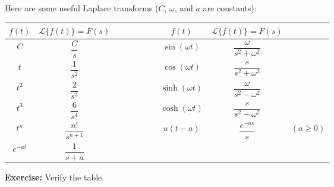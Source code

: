 \documentclass[10pt,aspectratio=169]{beamer}
\begin{document}
\begin{frame}

Here are some useful Laplace transforms ($C$, $\omega$, and $a$ are constants):

\begin{center}
\begin{tabular}{@{}ccclccc@{}}
\toprule
$f(t)$ & $\mathcal{L} \bigl\{ f(t) \bigr\} = F(s)$ &  & $\qquad\quad$ &
$f(t)$ & $\mathcal{L} \bigl\{ f(t) \bigr\} = F(s)$ \\
\midrule
$C$ & $\dfrac{C}{s}$
&
& &
$\sin (\omega t)$ & $\dfrac{\omega}{s^2+\omega^2}$
&
\\[12pt]
$t$ & $\dfrac{1}{s^2}$
&
& &
$\cos (\omega t)$ & $\dfrac{s}{s^2+\omega^2}$
&
\\[12pt]
$t^2$ & $\dfrac{2}{s^3}$
&
& &
$\sinh (\omega t)$ & $\dfrac{\omega}{s^2-\omega^2}$
&
\\[12pt]
$t^3$ & $\dfrac{6}{s^4}$
&
& &
$\cosh (\omega t)$ & $\dfrac{s}{s^2-\omega^2}$
&
\\[12pt]
$t^n$ & $\dfrac{n!}{s^{n+1}}$
&
& &
$u(t-a)$ & $\dfrac{e^{-as}}{s}$
& $(a \geq 0)$
\\[12pt]
$e^{-at}$ & $\dfrac{1}{s+a}$
&
& & &
&
\\[12pt]
\bottomrule
\end{tabular}
\end{center}

\pause

\textbf{Exercise:}
Verify the table.

\end{frame}
\end{document}
